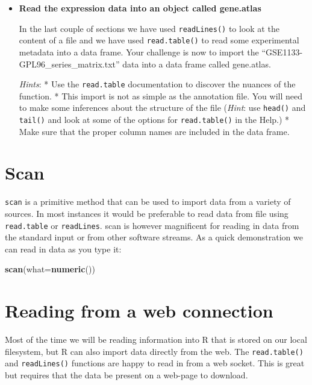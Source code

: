 \documentclass[a4paper]{book}
\newenvironment{Shaded}{\begin{snugshade}}{\end{snugshade}}
\newcommand{\KeywordTok}[1]{\textcolor[rgb]{0.13,0.29,0.53}{\textbf{{#1}}}}
\newcommand{\DataTypeTok}[1]{\textcolor[rgb]{0.13,0.29,0.53}{{#1}}}
\newcommand{\NormalTok}[1]{{#1}}
\renewenvironment{Shaded}
{\vspace{1.5em}\begin{leftbar}\begin{snugshade}}
{\end{snugshade}\end{leftbar}\vspace{3pt}}
\newenvironment{rmdblock}[1]
  {\vspace{1.5em}\begin{shaded*}
  \begin{itemize}
  \renewcommand{\labelitemi}{
    \raisebox{-.7\height}[0pt][0pt]{
      {\setkeys{Gin}{width=3em,keepaspectratio}\texttt{[image: images/\#1]}}
    }
  }
  \item
  }
  {
  \end{itemize}
  \end{shaded*}
  }
\newenvironment{rmdexercise}
  {\begin{rmdblock}{exercise}}
  {\end{rmdblock}}
\begin{document}
\begin{rmdexercise}
\textbf{Read the expression data into an object called gene.atlas}

In the last couple of sections we have used \texttt{readLines()} to look
at the content of a file and we have used \texttt{read.table()} to read
some experimental metadata into a data frame. Your challenge is now to
import the ``GSE1133-GPL96\_series\_matrix.txt'' data into a data frame
called gene.atlas.

\emph{Hints}: * Use the \texttt{read.table} documentation to discover
the nuances of the function. * This import is not as simple as the
annotation file. You will need to make some inferences about the
structure of the file (\emph{Hint}: use \texttt{head()} and
\texttt{tail()} and look at some of the options for
\texttt{read.table()} in the Help.) * Make sure that the proper column
names are included in the data frame.
\end{rmdexercise}

\section{Scan}\label{scan}

\texttt{scan} is a primitive method that can be used to import data from
a variety of sources. In most instances it would be preferable to read
data from file using \texttt{read.table} or \texttt{readLines}. scan is
however magnificent for reading in data from the standard input or from
other software streams. As a quick demonstration we can read in data as
you type it:

\begin{Shaded}
\begin{Highlighting}[]
\KeywordTok{scan}\NormalTok{(}\DataTypeTok{what=}\KeywordTok{numeric}\NormalTok{())}
\end{Highlighting}
\end{Shaded}

\section{Reading from a web
connection}\label{reading-from-a-web-connection}

Most of the time we will be reading information into R that is stored on
our local filesystem, but R can also import data directly from the web.
The \texttt{read.table()} and \texttt{readLines()} functions are happy
to read in from a web socket. This is great but requires that the data
be present on a web-page to download.
\end{document}
